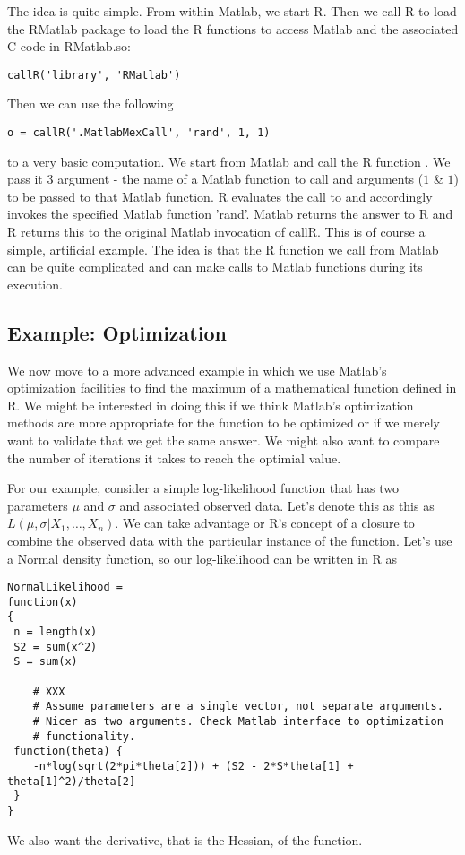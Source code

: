 \documentclass{article}
\begin{document}
The idea is quite simple.
From within Matlab, we start R.
Then we call R to load the
RMatlab package to load
the R functions to access Matlab 
and the associated C code in RMatlab.so:
\begin{verbatim}
callR('library', 'RMatlab')
\end{verbatim}
Then we can use the following
\begin{verbatim}
o = callR('.MatlabMexCall', 'rand', 1, 1)
\end{verbatim}
to a very basic computation.  We start from Matlab and call the R
function .  We pass it 3 argument - the name
of a Matlab function to call and arguments ($1$ \& $1$) to be passed
to that Matlab function.  R evaluates the call to
 and accordingly invokes the specified
Matlab function 'rand'.  Matlab returns the answer to R and R returns
this to the original Matlab invocation of callR.  This is of course a
simple, artificial example.  The idea is that the R function we call
from Matlab can be quite complicated and can make calls to Matlab
functions during its execution.






\subsection{Example: Optimization}
We now move to a more advanced example in which we use Matlab's
optimization facilities to find the maximum of a mathematical function
defined in R.  We might be interested in doing this if we think
Matlab's optimization methods are more appropriate for the function to
be optimized or if we merely want to validate that we get the same
answer.  We might also want to compare the number of iterations it
takes to reach the optimial value.

For our example, consider a simple log-likelihood function that has
two parameters $\mu$ and $\sigma$ and associated observed data.  Let's
denote this as this as $L(\mu, \sigma\vert X_1, \ldots, X_n)$.  We can
take advantage or R's concept of a closure to combine the observed
data with the particular instance of the function.
Let's use a Normal density function, so our log-likelihood 
can be written in R as
\begin{verbatim}
NormalLikelihood = 
function(x)
{
 n = length(x)
 S2 = sum(x^2)
 S = sum(x)

    # XXX
    # Assume parameters are a single vector, not separate arguments. 
    # Nicer as two arguments. Check Matlab interface to optimization 
    # functionality.
 function(theta) {
    -n*log(sqrt(2*pi*theta[2])) + (S2 - 2*S*theta[1] + theta[1]^2)/theta[2]
 }
}
\end{verbatim}
We also want the derivative, that is the Hessian, of the function.
\end{document}

